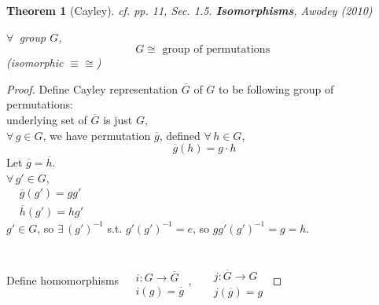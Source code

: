 \documentclass[10pt]{amsart}
\newtheorem{theorem}{Theorem}
\begin{document}
\begin{multicols*}{2}
\begin{theorem}[Cayley]
cf. pp. 11, Sec. 1.5. \textbf{Isomorphisms}, Awodey (2010) \cite{Awod2010}

$\forall \, $ group $G$, 
\[
G \cong \text{ group of permutations }
\]
(isomorphic $\equiv \cong$)

\end{theorem} 

\begin{proof}
	Define Cayley representation $\overline{G}$ of $G$ to be following group of permutations: \\
	underlying set of $\overline{G}$ is just $G$, \\
	$\forall \, g\in G$, we have permutation $\overline{g}$, defined $\forall \, h \in G$, 
	\[
	\overline{g}(h) = g\cdot h
	\]
	Let $\overline{g} = \overline{h}$. \\
	$\forall \, g' \in G$, \\
	$\begin{aligned}
	& \overline{g}(g') = gg' \\ 
	& \overline{h}(g') = hg'
	\end{aligned}$ \\
	$g' \in G$, so $\exists \, (g')^{-1}$ s.t. $g'(g')^{-1} =e$, so $gg'(g')^{-1}= g=h$.
	
	\quad \\
	Define homomorphisms $\begin{aligned} & \quad \\ 
	& i : G \to \overline{G} \\
	& i(g) = \overline{g}
	\end{aligned}$, \qquad \, $\begin{aligned} & \quad \\ 
	& j : \overline{G} \to G \\
	& j(\overline{g}) =  g
	\end{aligned}$
	

\end{proof}
\end{multicols*}
\end{document}
